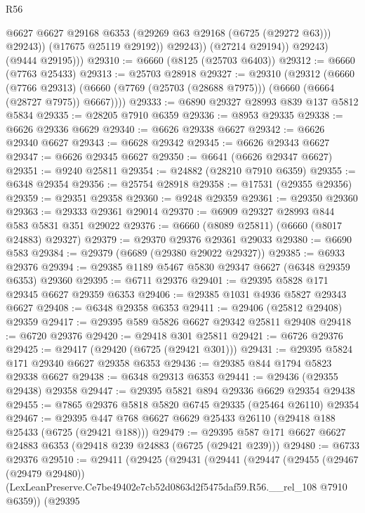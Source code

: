 \begin{lexlean}{R56}
\begin{coremodule}
                      @6627
                      @6627
                      @29168
                      @6353
                      (@29269 @63 @29168 (@6725 (@29272 @63)))
                      @29243))
                  (@17675 @25119 @29192))
                @29243))
            (@27214 @29194))
          @29243)
        (@9444 @29195)))
@29310 := @6660 (@8125 (@25703 @6403))
@29312 := @6660 (@7763 @25433)
@29313 := @25703 @28918
@29327 := @29310
    (@29312
      (@6660
        (@7766 @29313)
        (@6660 (@7769 (@25703 (@28688 @7975))) (@6660 (@6664 (@28727 @7975)) @6667))))
@29333 := @6890 @29327 @28993 @839 @137 @5812 @5834
@29335 := @28205 @7910 @6359
@29336 := @8953 @29335
@29338 := @6626 @29336 @6629
@29340 := @6626 @29338 @6627
@29342 := @6626 @29340 @6627
@29343 := @6628 @29342
@29345 := @6626 @29343 @6627
@29347 := @6626 @29345 @6627
@29350 := @6641 (@6626 @29347 @6627)
@29351 := @9240 @25811
@29354 := @24882 (@28210 @7910 @6359)
@29355 := @6348 @29354
@29356 := @25754 @28918
@29358 := @17531 (@29355 @29356)
@29359 := @29351 @29358
@29360 := @9248 @29359
@29361 := @29350 @29360
@29363 := @29333 @29361 @29014
@29370 := @6909 @29327 @28993 @844 @583 @5831 @351 @29022
@29376 := @6660 (@8089 @25811) (@6660 (@8017 @24883) @29327)
@29379 := @29370 @29376 @29361 @29033
@29380 := @6690 @583
@29384 := @29379 (@6689 (@29380 @29022 @29327))
@29385 := @6933 @29376
@29394 := @29385 @1189 @5467 @5830 @29347 @6627 (@6348 @29359 @6353) @29360
@29395 := @6711 @29376
@29401 := @29395 @5828 @171 @29345 @6627 @29359 @6353
@29406 := @29385 @1031 @4936 @5827 @29343 @6627
@29408 := @6348 @29358 @6353
@29411 := @29406 (@25812 @29408) @29359
@29417 := @29395 @589 @5826 @6627 @29342 @25811 @29408
@29418 := @6720 @29376
@29420 := @29418 @301 @25811
@29421 := @6726 @29376
@29425 := @29417 (@29420 (@6725 (@29421 @301)))
@29431 := @29395 @5824 @171 @29340 @6627 @29358 @6353
@29436 := @29385 @844 @1794 @5823 @29338 @6627
@29438 := @6348 @29313 @6353
@29441 := @29436 (@29355 @29438) @29358
@29447 := @29395 @5821 @894 @29336 @6629 @29354 @29438
@29455 := @7865 @29376 @5818 @5820 @6745 @29335 (@25464 @26110) @29354
@29467 := @29395 @447 @768 @6627 @6629 @25433 @26110 (@29418 @188 @25433 (@6725 (@29421 @188)))
@29479 := @29395 @587 @171 @6627 @6627 @24883 @6353 (@29418 @239 @24883 (@6725 (@29421 @239)))
@29480 := @6733 @29376
@29510 := @29411
    (@29425
      (@29431
        (@29441
          (@29447
            (@29455
              (@29467 (@29479 @29480))
              (LexLeanPreserve.Ce7be49402e7cb52d0863d2f5475daf59.R56.__rel_108 @7910 @6359))
            (@29395

\end{coremodule}
\end{lexlean}
